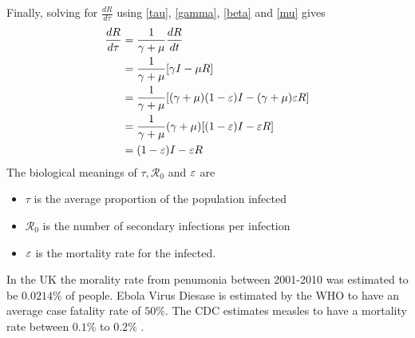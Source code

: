 Finally, solving for $\frac{dR}{d\tau}$ using \ref{tau}, \ref{gamma}, \ref{beta} and \ref{mu} gives
\begin{align*}
    \frac{dR}{d\tau} &= \frac{1}{\gamma+\mu}\frac{dR}{dt}\nonumber\\
     &= \frac{1}{\gamma+\mu}[\gamma I - \mu R]\nonumber\\
     &= \frac{1}{\gamma+\mu}[(\gamma+\mu)(1-\varepsilon)I - (\gamma+\mu)\varepsilon R]\nonumber\\
     &= \frac{1}{\gamma+\mu}(\gamma+\mu)[(1-\varepsilon)I - \varepsilon R]\nonumber\\
     &= (1-\varepsilon)I - \varepsilon R
\end{align*}
The biological meanings of $\tau, {\mathcal R_0}$ and $\varepsilon$ are
\begin{itemize}
    \item $\tau$ is the average proportion of the population infected
    \item ${\mathcal R_0}$ is the number of secondary infections per infection
    \item $\varepsilon$ is the mortality rate for the infected.
\end{itemize}

In the UK the morality rate from penumonia between 2001-2010 was estimated to be $0.0214\%$ of people\cite{pneu}.
Ebola Virus Diesase is estimated by the WHO to have an average case fatality rate of $50\%$\cite{ebola}.
The CDC estimates measles to have a mortality rate between $0.1\%$ to $0.2\%$ \cite{meas}.
